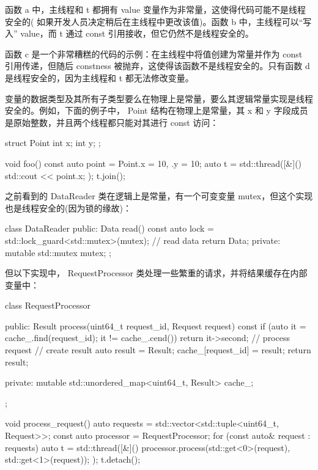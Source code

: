 函数 a 中，主线程和 t 都拥有 value 变量作为非常量，这使得代码可能不是线程安全的( 如果开发人员决定稍后在主线程中更改该值)。函数 b 中，主线程可以“写入” value，而 t 通过 const 引用接收，但它仍然不是线程安全的。

函数 c 是一个非常糟糕的代码的示例：在主线程中将值创建为常量并作为 const 引用传递，但随后 constness 被抛弃，这使得该函数不是线程安全的。只有函数 d 是线程安全的，因为主线程和 t 都无法修改变量。

变量的数据类型及其所有子类型要么在物理上是常量，要么其逻辑常量实现是线程安全的。例如，下面的例子中， Point 结构在物理上是常量，其 x 和 y 字段成员是原始整数，并且两个线程都只能对其进行 const 访问：

\begin{cpp}
struct Point {
    int x;
    int y;
};

void foo() {
    const auto point = Point{.x = 10, .y = 10};
    auto t = std::thread([&]() { std::cout <<
        point.x; });
    t.join();
}
\end{cpp}

之前看到的 DataReader 类在逻辑上是常量，有一个可变变量 mutex，但这个实现也是线程安全的(因为锁的缘故)：

\begin{cpp}
class DataReader {
public:
    Data read() const {
        auto lock = std::lock_guard<std::mutex>(mutex);
        // read data
        return Data{};
    }
private:
    mutable std::mutex mutex;
};
\end{cpp}

但以下实现中， RequestProcessor 类处理一些繁重的请求，并将结果缓存在内部变量中：

\begin{cpp}
class RequestProcessor {
public:
    Result process(uint64_t request_id,
    Request request) const {
        if (auto it = cache_.find(request_id); it !=
        cache_.cend()) {
            return it->second;
        }
        // process request
        // create result
        auto result = Result{};
        cache_[request_id] = result;
        return result;
    }

private:
    mutable std::unordered_map<uint64_t, Result> cache_;
};

void process_request() {
    auto requests = std::vector<std::tuple<uint64_t,
        Request>>{};
    const auto processor = RequestProcessor{};
    for (const auto& request : requests) {
        auto t = std::thread([&]() {
            processor.process(std::get<0>(request),
            std::get<1>(request));
        });
        t.detach();
    }
}
\end{cpp}

